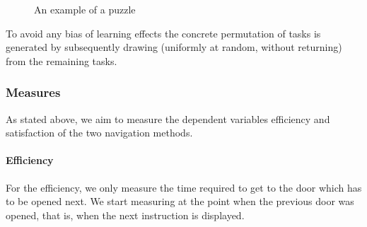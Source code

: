 \documentclass{sig-alternate-05-2015}
\begin{document}
\begin{figure}
\caption{An example of a puzzle}
\end{figure}

To avoid any bias of learning effects
the concrete permutation of tasks is generated by subsequently drawing
(uniformly at random, without returning) from the remaining tasks.

\subsubsection{Measures}
As stated above, we aim to measure the dependent variables efficiency and satisfaction of the two navigation methods.
\paragraph{Efficiency} For the efficiency, we only measure the time required to get to the door which has to be opened next. We start measuring at the point
when the previous door was opened, that is, when the next instruction is displayed.
\end{document}
